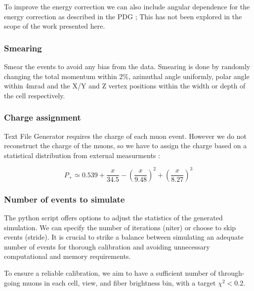 \documentclass[12pt]{article}
\begin{document}
To improve the energy correction we can also include angular dependence for the energy correction as described in the PDG \cite{rpp2022-rev-cosmic-rays.pdf}; This has not been explored in the scope of the work presented here.

\subsubsection{Smearing}
Smear the events to avoid any bias from the data. Smearing is done by randomly changing the total momentum within 2\%, azimuthal angle uniformly, polar angle within 4mrad and the X/Y and Z vertex positions within the width or depth of the cell respectively.

\subsubsection{Charge assignment}
Text File Generator requires the charge of each muon event. However we do not reconstruct the charge of the muons, so we have to assign the charge based on a statistical distribution from external measurments \cite{NOVA-doc-51327-v3}:


\begin{equation}
P_+ \simeq 0.539 + \frac{x}{34.5}-\left(\frac{x}{9.48}\right)^2 + \left(\frac{x}{8.27}\right)^3
\end{equation}

\subsubsection{Number of events to simulate}\label{secNumEvents}
The python script offers options to adjust the statistics of the generated simulation. We can specify the number of iterations (niter) or choose to skip events (stride). It is crucial to strike a balance between simulating an adequate number of events for thorough calibration and avoiding unnecessary computational and memory requirements.

To ensure a reliable calibration, we aim to have a sufficient number of through-going muons in each cell, view, and fiber brightness bin, with a target $\chi^2<0.2$.
\end{document}
